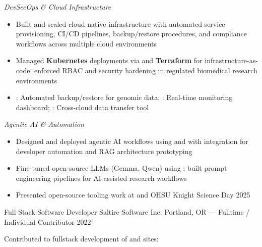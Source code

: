 \vspace{1em}

\emph{DevSecOps \& Cloud Infrastructure}

\begin{itemize}
    \item Built and scaled cloud-native infrastructure with automated service provisioning, CI/CD pipelines, backup/restore procedures, and compliance workflows across multiple cloud environments
    \item Managed \textbf{Kubernetes} deployments via  and \textbf{Terraform} for infrastructure-as-code; enforced RBAC and security hardening in regulated biomedical research environments
    \item {}: Automated backup/restore for genomic data; : Real-time monitoring dashboard; : Cross-cloud data transfer tool
\end{itemize}

\vspace{1em}

\emph{Agentic AI \& Automation}

\begin{itemize}
    \item Designed and deployed agentic AI workflows using  and  with  integration for developer automation and RAG architecture prototyping
    \item Fine-tuned open-source LLMs (Gemma, Qwen) using ; built prompt engineering pipelines for AI-assisted research workflows
    \item Presented open-source tooling work at  and OHSU Knight Science Day 2025
\end{itemize}

\newpage

\showoff
{Full Stack Software Developer}
{Saltire Software Inc.}
{Portland, OR --- Fulltime / Individual Contributor}
{2022}

Contributed to fullstack development of  and  sites:

